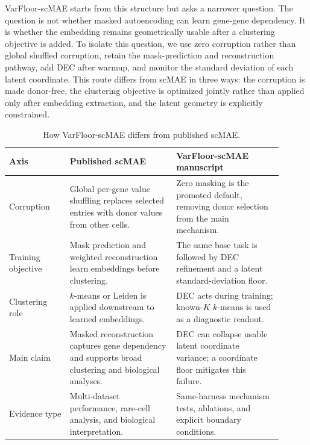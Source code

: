 \documentclass[11pt]{article}
\begin{document}
VarFloor-scMAE starts from this structure but asks a narrower question. The question is not whether masked autoencoding can learn gene-gene dependency. It is whether the embedding remains geometrically usable after a clustering objective is added. To isolate this question, we use zero corruption rather than global shuffled corruption, retain the mask-prediction and reconstruction pathway, add DEC after warmup, and monitor the standard deviation of each latent coordinate. This route differs from scMAE in three ways: the corruption is made donor-free, the clustering objective is optimized jointly rather than applied only after embedding extraction, and the latent geometry is explicitly constrained.

\begin{table}[t]
\centering
\small
\caption{How VarFloor-scMAE differs from published scMAE.}
\label{tab:scmae-comparison}
\begin{tabular}{>{\raggedright\arraybackslash}p{0.20\linewidth}>{\raggedright\arraybackslash}p{0.35\linewidth}>{\raggedright\arraybackslash}p{0.35\linewidth}}
\toprule
Axis & Published scMAE & VarFloor-scMAE manuscript \\
\midrule
Corruption & Global per-gene value shuffling replaces selected entries with donor values from other cells. & Zero masking is the promoted default, removing donor selection from the main mechanism. \\
Training objective & Mask prediction and weighted reconstruction learn embeddings before clustering. & The same base task is followed by DEC refinement and a latent standard-deviation floor. \\
Clustering role & $k$-means or Leiden is applied downstream to learned embeddings. & DEC acts during training; known-$K$ $k$-means is used as a diagnostic readout. \\
Main claim & Masked reconstruction captures gene dependency and supports broad clustering and biological analyses. & DEC can collapse usable latent coordinate variance; a coordinate floor mitigates this failure. \\
Evidence type & Multi-dataset performance, rare-cell analysis, and biological interpretation. & Same-harness mechanism tests, ablations, and explicit boundary conditions. \\
\bottomrule
\end{tabular}
\end{table}
\end{document}
